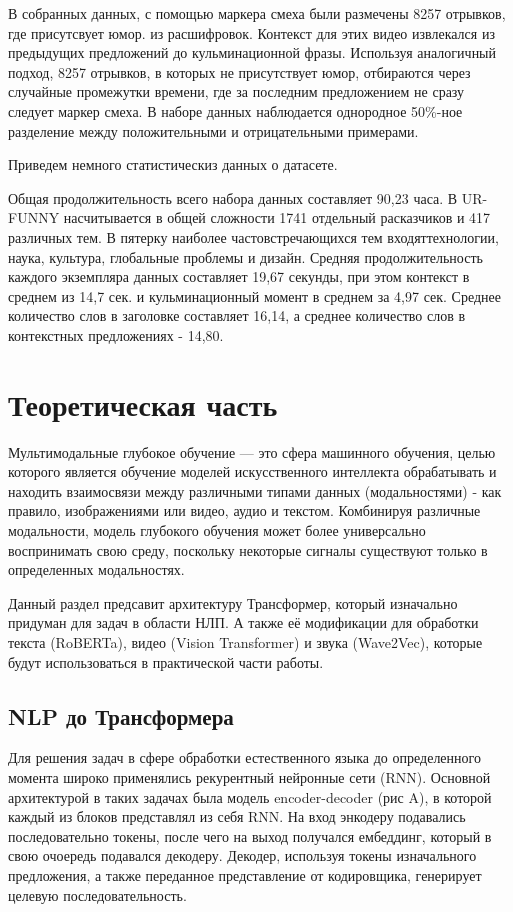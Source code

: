 \documentclass[PMI,KR]{HSEUniversity}
\begin{document}
В собранных данных, с помощью маркера смеха были размечены 8257 отрывков, где присутсвует юмор. из расшифровок. Контекст для этих видео извлекался из предыдущих предложений до кульминационной фразы. Используя аналогичный подход, 8257 отрывков, в которых не присутствует юмор, отбираются через случайные промежутки времени, где за последним предложением не сразу следует маркер смеха. 
В наборе данных наблюдается однородное 50\%-ное разделение между положительными и отрицательными примерами.

Приведем немного статистическиз данных о датасете.

Общая продолжительность всего набора данных составляет 90,23 часа. В UR-FUNNY насчитывается в общей сложности 1741 отдельный расказчиков и 417 различных тем. В пятерку наиболее частовстречающихся тем входяттехнологии, наука, культура, глобальные проблемы и дизайн. Средняя продолжительность каждого экземпляра данных составляет 19,67 секунды, при этом контекст в среднем из 14,7 сек. и кульминационный момент в среднем за 4,97 сек. Среднее количество слов в заголовке составляет 16,14, а среднее количество слов в контекстных предложениях - 14,80.


\chapter{Теоретическая часть}

Мультимодальные глубокое обучение — это сфера машинного обучения, целью которого является обучение моделей искусственного интеллекта обрабатывать и находить взаимосвязи между различными типами данных (модальностями) - как правило, изображениями или видео, аудио и текстом. Комбинируя различные модальности, модель глубокого обучения может более универсально воспринимать свою среду, поскольку некоторые сигналы существуют только в определенных модальностях.

Данный раздел предсавит архитектуру Трансформер, который изначально придуман для задач в области НЛП. А также её модификации для обработки текста (RoBERTa), видео (Vision Transformer) и звука (Wave2Vec), которые будут использоваться в практической части работы. 


\section{NLP до Трансформера}

Для решения задач в сфере обработки естественного языка до определенного момента широко применялись рекурентный нейронные сети (RNN). Основной архитектурой в таких задачах была модель encoder-decoder\cite{seq2seq:2014} (рис A), в которой каждый из блоков  представлял из себя RNN. 
На вход энкодеру подавались последовательно токены, после чего на выход получался ембеддинг, который в свою очоередь подавался декодеру. Декодер, используя токены изначального предложения, а также переданное представление от кодировщика, генерирует целевую последовательность.
\end{document}
